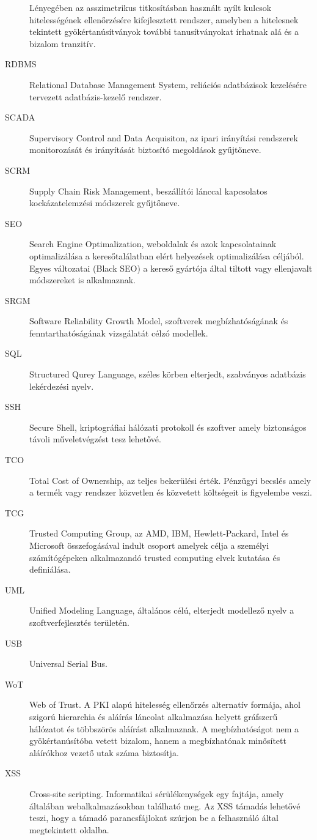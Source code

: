 \documentclass[12pt,magyar,a4paper,oneside]{scrreprt}
\begin{document}
\begin{description}
Lényegében az asszimetrikus titkosításban használt nyílt kulcsok
hitelességének ellenőrzésére kifejlesztett rendszer, amelyben a
hitelesnek tekintett gyökértanúsítványok további tanusítványokat
írhatnak alá és a bizalom tranzitív.
\item[RDBMS]
Relational Database Management System, reliációs adatbázisok kezelésére
tervezett adatbázis-kezelő rendszer.
\item[SCADA]
Supervisory Control and Data Acquisiton, az ipari irányítási rendszerek
monitorozását és irányítását biztosító megoldások gyűjtőneve.
\item[SCRM]
Supply Chain Risk Management, beszállítói lánccal kapcsolatos
kockázatelemzési módszerek gyűjtőneve.
\item[SEO]
Search Engine Optimalization, weboldalak és azok kapcsolatainak
optimalizálása a keresőtalálatban elért helyezések optimalizálása
céljából. Egyes változatai (Black SEO) a kereső gyártója által tiltott
vagy ellenjavalt módszereket is alkalmaznak.
\item[SRGM]
Software Reliability Growth Model, szoftverek megbízhatóságának és
fenntarthatóságának vizsgálatát célzó modellek.
\item[SQL]
Structured Qurey Language, széles körben elterjedt, szabványos adatbázis
lekérdezési nyelv.
\item[SSH]
Secure Shell, kriptográfiai hálózati protokoll és szoftver amely
biztonságos távoli műveletvégzést tesz lehetővé.
\item[TCO]
Total Cost of Ownership, az teljes bekerülési érték. Pénzügyi becslés
amely a termék vagy rendszer közvetlen és közvetett költségeit is
figyelembe veszi.
\item[TCG]
Trusted Computing Group, az AMD, IBM, Hewlett-Packard, Intel és
Microsoft összefogásával indult csoport amelyek célja a személyi
számítógépeken alkalmazandó trusted computing elvek kutatása és
definiálása.
\item[UML]
Unified Modeling Language, általános célú, elterjedt modellező nyelv a
szoftverfejlesztés területén.
\item[USB]
Universal Serial Bus.
\item[WoT]
Web of Trust. A PKI alapú hitelesség ellenőrzés alternatív formája, ahol
szigorú hierarchia és aláírás láncolat alkalmazása helyett gráfszerű
hálózatot és többszörös aláírást alkalmaznak. A megbízhatóságot nem a
gyökértanúsítóba vetett bizalom, hanem a megbízhatónak minősített
aláírókhoz vezető utak száma biztosítja.
\item[XSS]
Cross-site scripting. Informatikai sérülékenységek egy fajtája, amely
általában webalkalmazásokban található meg. Az XSS támadás lehetővé
teszi, hogy a támadó parancsfájlokat szúrjon be a felhasználó által
megtekintett oldalba.
\end{description}
\end{document}
